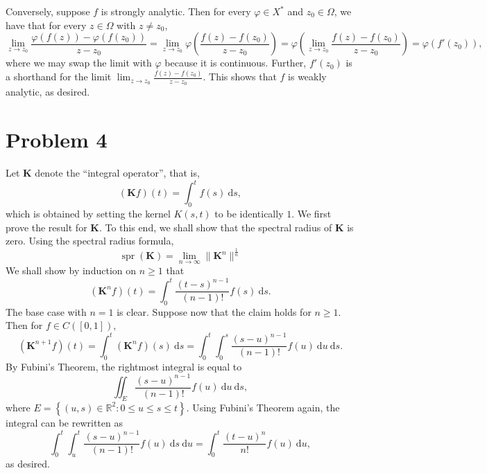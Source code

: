 \documentclass[11pt]{article}
\theoremstyle{thmstyle}
\theoremstyle{defstyle}
\newcommand{\R}{\mathbb{R}}
\renewcommand{\le}{\leqslant}
\renewcommand{\ge}{\geqslant}
\newcommand{\spr}{\operatorname{spr}}
\begin{document}
Conversely, suppose $f$ is strongly analytic. Then for every $\varphi\in X^\ast$ and $z_0\in\Omega$, we have that for every $z\in\Omega$ with $z\ne z_0$, 
\begin{equation*}
    \lim_{z\to z_0}\frac{\varphi(f(z)) - \varphi(f(z_0))}{z - z_0} = \lim_{z\to z_0}\varphi\left(\frac{f(z) - f(z_0)}{z - z_0}\right) = \varphi\left(\lim_{z\to z_0}\frac{f(z) - f(z_0)}{z - z_0}\right) = \varphi(f'(z_0)),
\end{equation*}
where we may swap the limit with $\varphi$ because it is continuous. Further, $f'(z_0)$ is a shorthand for the limit $\lim_{z\to z_0}\frac{f(z) - f(z_0)}{z - z_0}$. This shows that $f$ is weakly analytic, as desired.

\section{Problem 4}

Let $\mathbf K$ denote the ``integral operator'', that is, 
\begin{equation*}
    \left(\mathbf K f\right)(t) = \int_0^t f(s)~\mathrm ds,
\end{equation*}
which is obtained by setting the kernel $K(s, t)$ to be identically $1$. We first prove the result for $\mathbf K$. To this end, we shall show that the spectral radius of $\mathbf K$ is zero. Using the spectral radius formula,
\begin{equation*}
    \spr(\mathbf K) = \lim_{n\to\infty}\|\mathbf K^n\|^\frac{1}{n}
\end{equation*}
We shall show by induction on $n\ge 1$ that 
\begin{equation*}
    \left(\mathbf K^n f\right)(t)  = \int_0^t \frac{(t - s)^{n - 1}}{(n - 1)!}f(s)~\mathrm ds.
\end{equation*}
The base case with $n = 1$ is clear. Suppose now that the claim holds for $n\ge 1$. Then for $f\in C([0, 1])$, 
\begin{equation*}
    \left(\mathbf K^{n + 1}f\right)(t) = \int_0^t\left(\mathbf K^n f\right)(s)~\mathrm ds = \int_0^t\int_0^s\frac{(s - u)^{n - 1}}{(n - 1)!}f(u)~\mathrm du~\mathrm ds.
\end{equation*}
By Fubini's Theorem, the rightmost integral is equal to 
\begin{equation*}
    \iint_E\frac{(s - u)^{n - 1}}{(n - 1)!}f(u)~\mathrm du~\mathrm ds,
\end{equation*}
where $E = \left\{(u, s)\in\R^2\colon 0\le u\le s\le t\right\}$. Using Fubini's Theorem again, the integral can be rewritten as 
\begin{equation*}
    \int_{0}^t\int_u^t\frac{(s - u)^{n - 1}}{(n - 1)!}f(u)~\mathrm ds~\mathrm du = \int_0^t\frac{(t - u)^n}{n!}f(u)~\mathrm du,
\end{equation*}
as desired. 
\end{document}
